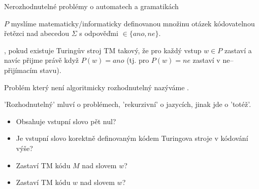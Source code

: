     
\begin{frame}{Nerozhodnutelné problémy o automatech a gramatikách}
    \begin{definition}
     $P$ myslíme matematicky/informaticky definovanou množinu otázek kódovatelnou řetězci nad abecedou $\Sigma$ s odpověďmi $\in\{ano, ne\}$.
    
    , pokud existuje Turingův stroj TM takový, že pro každý vstup $w\in P$ zastaví a navíc přijme právě když $P(w)=ano$ (tj. pro $P(w)=ne$ zastaví v ne--přijímacím stavu).
    
    Problém který není algoritmicky rozhodnutelný nazýváme .
    \end{definition}
    'Rozhodnutelný' mluví o problémech, 'rekurzivní' o jazycích, jinak jde o 'totéž'.
    \begin{example}['Problémy']
    \begin{itemize}%
        \item Obsahuje vstupní slovo pět nul?
        \item Je vstupní slovo korektně definovaným kódem Turingova stroje v kódování výše?
        \item Zastaví TM kódu $M$ nad slovem $w$?
        \item Zastaví TM kódu $w$ nad slovem $w$?
    \end{itemize}
    \end{example}
    \end{frame}
    
